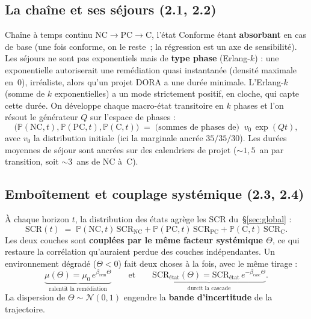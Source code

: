 \documentclass[11pt,a4paper]{article}
\begin{document}
\subsection{La chaîne et ses séjours (2.1, 2.2)}

Chaîne à temps continu $\text{NC}\to\text{PC}\to\text{C}$, l'état Conforme étant
\textbf{absorbant} en cas de base (une fois conforme, on le reste~; la régression est un axe de
sensibilité). Les séjours ne sont pas exponentiels mais de \textbf{type phase} (Erlang-$k$) :
une exponentielle autoriserait une remédiation quasi instantanée (densité maximale en~0),
irréaliste, alors qu'un projet DORA a une durée minimale. L'Erlang-$k$ (somme de $k$
exponentielles) a un mode strictement positif, en cloche, qui capte cette durée. On développe
chaque macro-état transitoire en $k$ phases et l'on résout le générateur $Q$ sur l'espace de
phases :
\begin{equation}
\big(\mathbb P(\text{NC},t),\mathbb P(\text{PC},t),\mathbb P(\text{C},t)\big)
\;=\; \text{(sommes de phases de)}\;\; v_0\,\exp(Qt),
\end{equation}
avec $v_0$ la distribution initiale (ici la marginale ancrée $35/35/30$). Les durées moyennes
de séjour sont ancrées sur des calendriers de projet ($\sim 1{,}5$~an par transition, soit
$\sim 3$~ans de NC à~C).

\subsection{Emboîtement et couplage systémique (2.3, 2.4)}

À chaque horizon $t$, la distribution des états agrège les SCR du~\S\ref{sec:global} :
\begin{equation}
\mathrm{SCR}(t) \;=\; \mathbb P(\text{NC},t)\,\mathrm{SCR}_{\text{NC}}
+ \mathbb P(\text{PC},t)\,\mathrm{SCR}_{\text{PC}}
+ \mathbb P(\text{C},t)\,\mathrm{SCR}_{\text{C}}.
\end{equation}
Les deux couches sont \textbf{couplées par le même facteur systémique $\Theta$}, ce qui
restaure la corrélation qu'auraient perdue des couches indépendantes. Un environnement dégradé
($\Theta<0$) fait deux choses à la fois, avec le même tirage :
\begin{equation}
\underbrace{\mu(\Theta)=\mu_0\,e^{\beta_{\text{rem}}\Theta}}_{\text{ralentit la remédiation}}
\qquad\text{et}\qquad
\underbrace{\mathrm{SCR}_{\text{état}}(\Theta)=\mathrm{SCR}_{\text{état}}\,e^{-\beta_{\text{casc}}\Theta}}_{\text{durcit la cascade}}.
\end{equation}
La dispersion de $\Theta\sim\mathcal N(0,1)$ engendre la \textbf{bande d'incertitude} de la
trajectoire.
\end{document}
